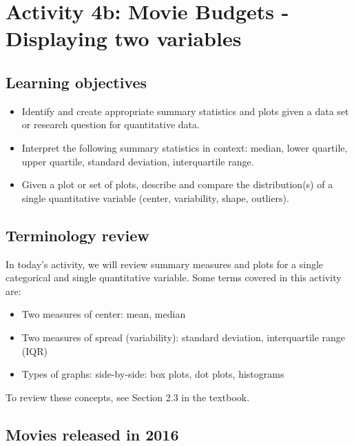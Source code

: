 \documentclass[
]{report}
\begin{document}
\hypertarget{activity-4b-movie-budgets---displaying-two-variables}{%
\section{Activity 4b: Movie Budgets - Displaying two variables}\label{activity-4b-movie-budgets---displaying-two-variables}}


\hypertarget{learning-objectives-1}{%
\subsection{Learning objectives}\label{learning-objectives-1}}

\begin{itemize}
\item
  Identify and create appropriate summary statistics and plots
  given a data set or research question for quantitative data.
\item
  Interpret the following summary statistics in context:
  median, lower quartile, upper quartile,
  standard deviation, interquartile range.
\item
  Given a plot or set of plots, describe and compare the distribution(s)
  of a single quantitative variable
  (center, variability, shape, outliers).
\end{itemize}

\hypertarget{terminology-review-8}{%
\subsection{Terminology review}\label{terminology-review-8}}

In today's activity, we will review summary measures and plots for a single categorical and single quantitative variable. Some terms covered in this activity are:

\begin{itemize}
\item
  Two measures of center: mean, median
\item
  Two measures of spread (variability): standard deviation, interquartile range (IQR)
\item
  Types of graphs: side-by-side: box plots, dot plots, histograms
\end{itemize}

To review these concepts, see Section 2.3 in the textbook.

\hypertarget{movies-released-in-2016-1}{%
\subsection{Movies released in 2016}\label{movies-released-in-2016-1}}
\end{document}
